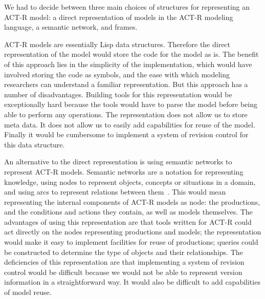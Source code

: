 We had to decide between three main choices of structures for
representing an ACT-R model: a direct representation of models in the
ACT-R modeling language, a semantic network, and frames.

ACT-R models are essentially Lisp data structures. Therefore the
direct representation of the model would store the code for the model
as is. The benefit of this approach lies in the simplicity of the
implementation, which would have involved storing the code as symbols,
and the ease with which modeling researchers can understand a familiar
representation. But this approach has a number of disadvantages.
Building tools for this representation would be exceptionally hard
because the tools would have to parse the model before being able to
perform any operations.  The representation does not allow us to store
meta data.  It does not allow us to easily add capabilities for reuse
of the model.  Finally it would be cumbersome to implement a system of
revision control for this data structure.

An alternative to the direct representation is using semantic networks
to represent ACT-R models. Semantic networks are a notation for
representing knowledge, using nodes to represent objects, concepts or
situations in a domain, and using arcs to represent relations between
them~\cite{Sowa87,Barr81}. This would mean representing the internal
components of ACT-R models as node: the productions, and the
conditions and actions they contain, as well as models themselves.
The advantages of using this representation are that tools written for
ACT-R could act directly on the nodes representing productions and
models; the representation would make it easy to implement facilities
for reuse of productions; queries could be constructed to determine
the type of objects and their relationships. The deficiencies of this
representation are that implementing a system of revision control
would be difficult because we would not be able to represent version
information in a straightforward way.  It would also be difficult to
add capabilities of model reuse.


